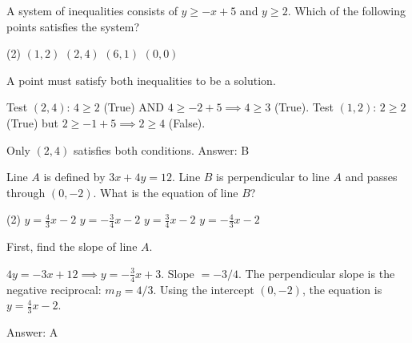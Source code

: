 \documentclass[11pt,paper=a4,answers]{exam}
\begin{document}
\begin{questions}
\question
\begin{center}
\end{center}
A system of inequalities consists of $y \geq -x + 5$ and $y \geq 2$. Which of the following points satisfies the system?
\begin{tasks}(2)
\task $(1, 2)$
\task $(2, 4)$
\task $(6, 1)$
\task $(0, 0)$
\end{tasks}

\begin{solution}
A point must satisfy both inequalities to be a solution.
\vspace{5pt}
\begin{center}
Test $(2, 4)$: $4 \geq 2$ (True) AND $4 \geq -2 + 5 \implies 4 \geq 3$ (True).
\vspace{5pt}
Test $(1, 2)$: $2 \geq 2$ (True) but $2 \geq -1 + 5 \implies 2 \geq 4$ (False).
\end{center}
\vspace{5pt}
Only $(2, 4)$ satisfies both conditions.
\vspace{5pt}
Answer: \colorbox{yellow!100}{B}
\end{solution}

\vspace{1cm}

\question
Line $A$ is defined by $3x + 4y = 12$. Line $B$ is perpendicular to line $A$ and passes through $(0, -2)$. What is the equation of line $B$?
\begin{tasks}(2)
\task $y = \frac{4}{3}x - 2$
\task $y = -\frac{3}{4}x - 2$
\task $y = \frac{3}{4}x - 2$
\task $y = -\frac{4}{3}x - 2$
\end{tasks}

\begin{solution}
First, find the slope of line $A$.
\vspace{5pt}
\begin{center}
$4y = -3x + 12 \implies y = -\frac{3}{4}x + 3$. Slope $= -3/4$.
\vspace{5pt}
The perpendicular slope is the negative reciprocal: $m_B = 4/3$.
\vspace{5pt}
Using the intercept $(0, -2)$, the equation is $y = \frac{4}{3}x - 2$.
\end{center}
\vspace{5pt}
Answer: \colorbox{yellow!100}{A}
\end{solution}


\end{questions}
\end{document}
